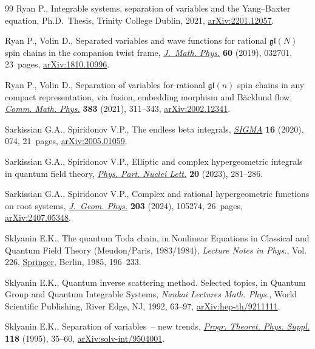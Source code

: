 \begin{thebibliography}{99}
Ryan P., Integrable systems, separation of variables and the {Y}ang--{B}axter
 equation, Ph.D.~Thesis, {T}rinity College Dublin, 2021,
 \href{http://arxiv.org/abs/2201.12057}{arXiv:2201.12057}.

Ryan P., Volin D., Separated variables and wave functions for rational
 {$\mathfrak{gl}(N)$} spin chains in the companion twist frame,
 \href{https://doi.org/10.1063/1.5085387}{\textit{J.~Math. Phys.}} \textbf{60}
 (2019), 032701, 23~pages,
 \href{http://arxiv.org/abs/1810.10996}{arXiv:1810.10996}.

Ryan P., Volin D., Separation of variables for rational {$\mathfrak{gl}(n)$}
 spin chains in any compact representation, via fusion, embedding morphism and
 {B}\"acklund flow,
 \href{https://doi.org/10.1007/s00220-021-03990-7}{\textit{Comm. Math. Phys.}}
 \textbf{383} (2021), 311--343,
 \href{http://arxiv.org/abs/2002.12341}{arXiv:2002.12341}.

Sarkissian G.A., Spiridonov V.P., The endless beta integrals,
 \href{https://doi.org/10.3842/SIGMA.2020.074}{\textit{SIGMA}} \textbf{16}
 (2020), 074, 21~pages,
 \href{http://arxiv.org/abs/2005.01059}{arXiv:2005.01059}.

Sarkissian G.A., Spiridonov V.P., Elliptic and complex hypergeometric integrals
 in quantum field theory,
 \href{https://doi.org/10.1134/S1547477123030603}{\textit{Phys. Part. Nuclei
 Lett.}} \textbf{20} (2023), 281--286.

Sarkissian G.A., Spiridonov V.P., Complex and rational hypergeometric functions
 on root systems,
 \href{https://doi.org/10.1016/j.geomphys.2024.105274}{\textit{J.~Geom.
 Phys.}} \textbf{203} (2024), 105274, 26~pages,
 \href{http://arxiv.org/abs/2407.05348}{arXiv:2407.05348}.

Sklyanin E.K., The quantum {T}oda chain, in Nonlinear Equations in Classical
 and Quantum Field Theory ({M}eudon/{P}aris, 1983/1984), \textit{Lecture Notes
 in Phys.}, Vol. 226,
 \href{https://doi.org/10.1007/3-540-15213-X_80}{Springer}, Berlin, 1985,
 196--233.

Sklyanin E.K., Quantum inverse scattering method. {S}elected topics, in Quantum
 Group and Quantum Integrable Systems, \textit{Nankai Lectures Math. Phys.}, World
 Scientific Publishing, River Edge, NJ, 1992, 63--97,
 \href{http://arxiv.org/abs/hep-th/9211111}{arXiv:hep-th/9211111}.

Sklyanin E.K., Separation of variables~-- new trends,
 \href{https://doi.org/10.1143/PTPS.118.35}{\textit{Progr. Theoret. Phys.
 Suppl.}} \textbf{118} (1995), 35--60,
 \href{http://arxiv.org/abs/solv-int/9504001}{arXiv:solv-int/9504001}.


\end{thebibliography}
